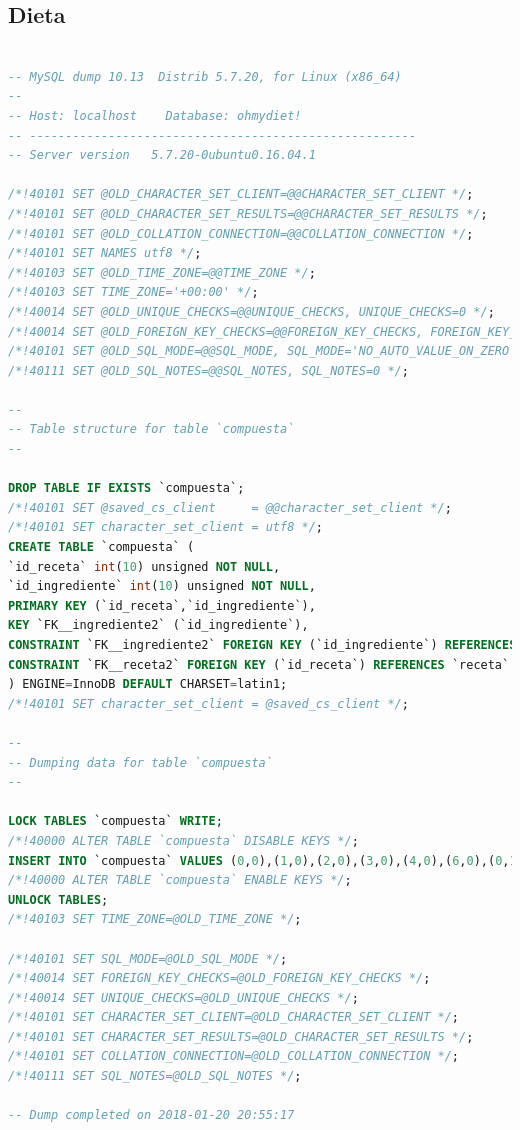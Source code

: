 \documentclass[12pt,letterpaper]{article}
\begin{document}
\subsection{Dieta}
\begin{lstlisting}[language=sql]

-- MySQL dump 10.13  Distrib 5.7.20, for Linux (x86_64)
--
-- Host: localhost    Database: ohmydiet!
-- ------------------------------------------------------
-- Server version	5.7.20-0ubuntu0.16.04.1

/*!40101 SET @OLD_CHARACTER_SET_CLIENT=@@CHARACTER_SET_CLIENT */;
/*!40101 SET @OLD_CHARACTER_SET_RESULTS=@@CHARACTER_SET_RESULTS */;
/*!40101 SET @OLD_COLLATION_CONNECTION=@@COLLATION_CONNECTION */;
/*!40101 SET NAMES utf8 */;
/*!40103 SET @OLD_TIME_ZONE=@@TIME_ZONE */;
/*!40103 SET TIME_ZONE='+00:00' */;
/*!40014 SET @OLD_UNIQUE_CHECKS=@@UNIQUE_CHECKS, UNIQUE_CHECKS=0 */;
/*!40014 SET @OLD_FOREIGN_KEY_CHECKS=@@FOREIGN_KEY_CHECKS, FOREIGN_KEY_CHECKS=0 */;
/*!40101 SET @OLD_SQL_MODE=@@SQL_MODE, SQL_MODE='NO_AUTO_VALUE_ON_ZERO' */;
/*!40111 SET @OLD_SQL_NOTES=@@SQL_NOTES, SQL_NOTES=0 */;

--
-- Table structure for table `compuesta`
--

DROP TABLE IF EXISTS `compuesta`;
/*!40101 SET @saved_cs_client     = @@character_set_client */;
/*!40101 SET character_set_client = utf8 */;
CREATE TABLE `compuesta` (
`id_receta` int(10) unsigned NOT NULL,
`id_ingrediente` int(10) unsigned NOT NULL,
PRIMARY KEY (`id_receta`,`id_ingrediente`),
KEY `FK__ingrediente2` (`id_ingrediente`),
CONSTRAINT `FK__ingrediente2` FOREIGN KEY (`id_ingrediente`) REFERENCES `ingrediente` (`id_ingrediente`),
CONSTRAINT `FK__receta2` FOREIGN KEY (`id_receta`) REFERENCES `receta` (`id_receta`)
) ENGINE=InnoDB DEFAULT CHARSET=latin1;
/*!40101 SET character_set_client = @saved_cs_client */;

--
-- Dumping data for table `compuesta`
--

LOCK TABLES `compuesta` WRITE;
/*!40000 ALTER TABLE `compuesta` DISABLE KEYS */;
INSERT INTO `compuesta` VALUES (0,0),(1,0),(2,0),(3,0),(4,0),(6,0),(0,1),(1,6),(2,6),(4,6),(1,7),(2,7),(5,7),(1,8),(2,8),(0,9),(1,9),(2,9),(1,10),(6,10),(3,11),(5,11),(4,14),(4,20),(5,20),(6,20),(0,25),(2,26),(3,27),(4,28),(5,29),(6,30),(6,31),(6,32);
/*!40000 ALTER TABLE `compuesta` ENABLE KEYS */;
UNLOCK TABLES;
/*!40103 SET TIME_ZONE=@OLD_TIME_ZONE */;

/*!40101 SET SQL_MODE=@OLD_SQL_MODE */;
/*!40014 SET FOREIGN_KEY_CHECKS=@OLD_FOREIGN_KEY_CHECKS */;
/*!40014 SET UNIQUE_CHECKS=@OLD_UNIQUE_CHECKS */;
/*!40101 SET CHARACTER_SET_CLIENT=@OLD_CHARACTER_SET_CLIENT */;
/*!40101 SET CHARACTER_SET_RESULTS=@OLD_CHARACTER_SET_RESULTS */;
/*!40101 SET COLLATION_CONNECTION=@OLD_COLLATION_CONNECTION */;
/*!40111 SET SQL_NOTES=@OLD_SQL_NOTES */;

-- Dump completed on 2018-01-20 20:55:17
\end{lstlisting}
\end{document}
